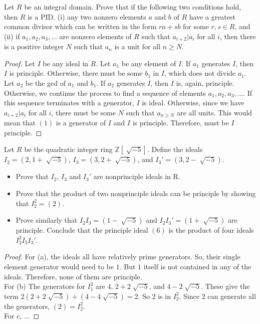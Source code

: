 \documentclass[10pt]{article}
\newenvironment{problem}[2][Problem]{\begin{trivlist}
		\item[\hskip \labelsep {\bfseries #1}\hskip \labelsep {\bfseries #2.}]}{\end{trivlist}}
\begin{document}
	\begin{problem}{2.4}
		
		Let $R$ be an integral domain. Prove that if the following two conditions hold, then $R$ is a PID.
		(i) any two nonzero elements $a$ and $b$ of $R$ have a greatest common divisor which can be written in the form $ra+sb$ for some $r,s \in R$, and (ii) if $a_{1}, a_{2}, a_{3}, ...$ are nonzero elements of $R$ such that $a_{i+2}|a_{i}$ for all $i$, then there is a positive integer $N$ such that $a_{n}$ is a unit for all $n \geq N$.
		\begin{proof}
			Let $I$ be any ideal in $R$. Let $a_{1}$ be any element of $I$. If $a_{1}$ generates $I$, then $I$ is principle. Otherwise, there must be some $b_{1}$ in $I$, which does not divide $a_{1}$. Let $a_{2}$ be the gcd of $a_{1}$ and $b_{1}$. If $a_{2}$ generates $I$, then $I$ is, again, principle. Otherwise, we continue the process to find a sequence of elements $a_{1}, a_{2}, a_{3}, ... $. If this sequence terminates with a generator, $I$ is ideal. Otherwise, since we have $a_{i+2}|a_{i}$ for all $i$, there must be some $N$ such that $a_{n \geq N}$ are all units. This would mean that $(1)$ is a generator of $I$ and $I$ is principle. Therefore, must be $I$ principle.
		\end{proof}
	\end{problem}
	
	\begin{problem}{2.5}
		Let $R$ be the quadratic integer ring $\mathbb{Z}[\sqrt[]{-5}]$. Define the ideals $I_{2}=(2,1+\sqrt[]{-5})$, $I_{3}=(3,2+\sqrt[]{-5})$, and $I_{3}'=(3,2-\sqrt[]{-5})$.
		\begin{itemize}
			\item[(a)] Prove that $I_{2}$, $I_{3}$ and $I_{3}'$ are nonprinciple ideals in R.
			\item[(b)] Prove that the product of two nonprinciple ideals can be principle by showing that $I_{2}^{2} = (2)$.
			\item[(c)] Prove similarly that $I_{2}I_{3}=(1-\sqrt[]{-5})$ and $I_{2}I_{3}'=(1+\sqrt[]{-5})$ are principle. Conclude that the principle ideal $(6)$ is the product of four ideals $I_{2}^{2}I_{3}I_{3}'$.
		\end{itemize}
		
		\begin{proof}
			For (a), the ideals all have relatively prime generators. So, their single element generator would need to be $1$. But $1$ itself is not contained in any of the ideals. Therefore, none of them are principle.\\
			For (b) The generators for $I_{1}^{2}$ are $4$, $2+2\sqrt[]{-5}$, and $4-2\sqrt[]{-5}$. These give the term $2(2+2\sqrt[]{-5}) + (4-4\sqrt[]{-5}) = 2$. So $2$ is in $I_{2}^{2}$. Since $2$ can generate all the generators, $(2)=I_{2}^{2}$.\\
			For c, ...
		\end{proof}
	\end{problem}
	
\end{document}
